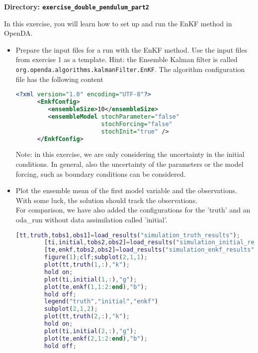 {\bf Directory: {\tt exercise\_double\_pendulum\_part2}}

In this exercise, you will learn how to set up and run the EnKF method in OpenDA.

\begin{itemize}
  \item Prepare the input files for a run with the EnKF method. Use the input
        files from exercise 1 as a template. Hint: the Ensemble Kalman filter
        is called \verb|org.openda.algorithms.kalmanFilter.EnKF|. The algorithm
        configuration file has the following content
      \begin{lstlisting}[language=XML,frame=single,caption={XML input for EnKF algorithm}]
      <?xml version="1.0" encoding="UTF-8"?>
      <EnkfConfig>
         <ensembleSize>10</ensembleSize>
         <ensembleModel stochParameter="false"
                        stochForcing="false"
                        stochInit="true" />
      </EnkfConfig>
      \end{lstlisting}
      Note: in this exercise, we are only considering the uncertainty in the initial conditions. In general, also the uncertainty of the 
      parameters or the model forcing, such as boundary conditions can be considered.

  \item Plot the ensemble mean of the first model variable and the observations.
        With some luck, the solution should track the observations. \\
        For comparison, we have also added the configurations for the 'truth' and an oda\_run
        without data assimilation called 'initial'.
        
\ifshowmatlab
        \begin{lstlisting}[language=Matlab,frame=single,caption={Matlab}]
        [tt,truth,tobs1,obs1]=load_results("simulation_truth_results");
        [ti,initial,tobs2,obs2]=load_results("simulation_initial_results");
        [te,enkf,tobs2,obs2]=load_results("simulation_enkf_results");
        figure(1);clf;subplot(2,1,1);
        plot(tt,truth(1,:),"k");
        hold on;
        plot(ti,initial(1,:),"g");
        plot(te,enkf(1,1:2:end),"b");
        hold off;
        legend("truth","initial","enkf")
        subplot(2,1,2);
        plot(tt,truth(2,:),"k");
        hold on;
        plot(ti,initial(2,:),"g");
        plot(te,enkf(2,1:2:end),"b");
        hold off;
        \end{lstlisting}
\fi


\end{itemize}
